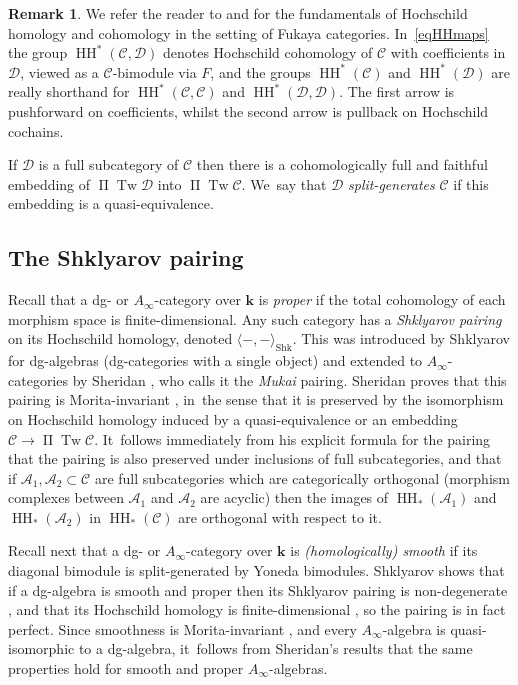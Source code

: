 \documentclass[JEP,XML,SOM,Unicode,NoEqCountersInSection,NoFloatCountersInSection,published]{cedram}
\theoremstyle{definition}
\newtheorem{remark}[theorem]{Remark}
\newcommand{\calA}{\mathcal{A}}
\newcommand{\calC}{\mathcal{C}}
\newcommand{\calD}{\mathcal{D}}
\newcommand{\kk}{{\boldsymbol{k}}}
\newcommand{\HH}{\operatorname{HH}}
\newcommand{\Tw}{\operatorname{Tw}}
\newcommand{\oPi}{\operatorname{\Pi}}
\newcommand{\PiTw}{\oPi \Tw}
\newcommand{\Shk}[2]{\langle #1, #2 \rangle_\mathrm{Shk}}
\begin{document}
\begin{remark}
We refer the reader to \cite[\S 2]{RitterSmith} and \cite[App.\,A]{SheridanFano} for the fundamentals of Hochschild homology and cohomology in the setting of Fukaya categories. In~\eqref{eqHHmaps} the group $\HH^*(\calC, \calD)$ denotes Hochschild cohomology of $\calC$ with coefficients in $\calD$, viewed as a $\calC$-bimodule via $F$, and the groups $\HH^*(\calC)$ and $\HH^*(\calD)$ are really shorthand for $\HH^*(\calC, \calC)$ and $\HH^*(\calD, \calD)$. The first arrow is pushforward on coefficients, whilst the second arrow is pullback on Hochschild cochains.
\end{remark}

If $\calD$ is a full subcategory of $\calC$ then there is a cohomologically full and faithful embedding of $\PiTw \calD$ into $\PiTw \calC$. We~say that $\calD$ \emph{split-generates} $\calC$ if this embedding is a quasi-equivalence.

\subsection{The Shklyarov pairing}
\label{sscShklyarov}

Recall that a dg- or $A_\infty$-category over $\kk$ is \emph{proper} if the total cohomology of each morphism space is finite-dimensional. Any such category has a \emph{Shklyarov pairing} on its Hochschild homology, denoted $\Shk{{-}}{{-}}$. This was introduced by Shklyarov \cite{ShklyarovHirzebruch} for dg-algebras (\ie dg-categories with a single object) and extended to $A_\infty$-categories by Sheridan \cite[\S 5]{SheridanHodge}, who calls it the \emph{Mukai} pairing. Sheridan proves that this pairing is Morita-invariant \cite[Prop.\,5.20]{SheridanHodge}, in~the sense that it is preserved by the isomorphism on Hochschild homology induced by a quasi-equivalence or an embedding $\calC \to \PiTw \calC$. It~follows immediately from his explicit formula for the pairing \cite[(35)]{SheridanHodge} that the pairing is also preserved under inclusions of full subcategories, and that if $\calA_1, \calA_2 \subset \calC$ are full subcategories which are categorically orthogonal (morphism complexes between $\calA_1$ and $\calA_2$ are acyclic) then the images of $\HH_*(\calA_1)$ and $\HH_*(\calA_2)$ in $\HH_*(\calC)$ are orthogonal with respect to it.

Recall next that a dg- or $A_\infty$-category over $\kk$ is \emph{(homologically) smooth} if its diagonal bimodule is split-generated by Yoneda bimodules. Shklyarov shows that if a dg-algebra is smooth and proper then its Shklyarov pairing is non-degenerate \cite[Th.\,5.3]{ShklyarovHirzebruch}, and that its Hochschild homology is finite-dimensional \cite[Th.\,4.6]{ShklyarovSerre}, so the pairing is in fact perfect. Since smoothness is Morita-invariant \cite[Prop.\,20]{GanatraAutomaticGeneration}, and every $A_\infty$-algebra is quasi-isomorphic to a dg-algebra, it~follows from Sheridan's results that the same properties hold for smooth and proper $A_\infty$-algebras.
\end{document}
